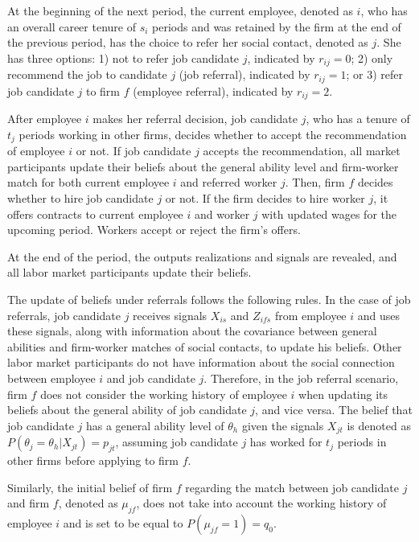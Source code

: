 \documentclass[12pt]{article}
\begin{document}
At the beginning of the next period, the current employee, denoted as $i$, who has an overall career tenure of $s_i$ periods and was retained by the firm at the end of the previous period, has the choice to refer her social contact, denoted as $j$. She has three options: 1) not to refer job candidate $j$, indicated by $r_{ij} = 0$; 2) only recommend the job to candidate $j$ (job referral), indicated by $r_{ij} = 1$; or 3) refer job candidate $j$ to firm $f$ (employee referral), indicated by $r_{ij} = 2$.

After employee $i$ makes her referral decision, job candidate $j$, who has a tenure of $t_j$ periods working in other firms, decides whether to accept the recommendation of employee $i$ or not. If job candidate $j$ accepts the recommendation, all market participants update their beliefs about the general ability level and firm-worker match for both current employee $i$ and referred worker $j$. Then, firm $f$ decides whether to hire job candidate $j$ or not. If the firm decides to hire worker $j$, it offers contracts to current employee $i$ and worker $j$ with updated wages for the upcoming period. Workers accept or reject the firm's offers.

At the end of the period, the outputs realizations and signals are revealed, and all labor market participants update their beliefs.

The update of beliefs under referrals follows the following rules. In the case of job referrals, job candidate $j$ receives signals $X_{is}$ and $Z_{ifs}$ from employee $i$ and uses these signals, along with information about the covariance between general abilities and firm-worker matches of social contacts, to update his beliefs. Other labor market participants do not have information about the social connection between employee $i$ and job candidate $j$. Therefore, in the job referral scenario, firm $f$ does not consider the working history of employee $i$ when updating its beliefs about the general ability of job candidate $j$, and vice versa. The belief that job candidate $j$ has a general ability level of $\theta_h$ given the signals $X_{jt}$ is denoted as $P(\theta_j = \theta_h | X_{jt}) = p_{jt}$, assuming job candidate $j$ has worked for $t_j$ periods in other firms before applying to firm $f$.

Similarly, the initial belief of firm $f$ regarding the match between job candidate $j$ and firm $f$, denoted as $\mu_{jf}$, does not take into account the working history of employee $i$ and is set to be equal to $P(\mu_{jf} = 1) = q_0$.
\end{document}
